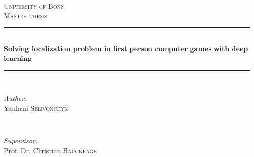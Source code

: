 \begin{titlepage}

\newcommand{\HRule}{\rule{\linewidth}{0.5mm}} %

\center %

\textsc{}\\[0.5cm]
\textsc{\LARGE University of Bonn}\\[3cm] %
\textsc{\Large Master thesis}\\[0.5cm] %


\HRule \\[0.4cm]
{ \huge \bfseries Solving localization problem in first person computer games with deep learning}\\[0.4cm] %
\HRule \\[1.5cm]


\begin{minipage}{0.4\textwidth}
  \begin{flushleft} \large
  \emph{Author:}\\
  Yauheni \textsc{Selivonchyk} %
  \end{flushleft}
\end{minipage}
~
\begin{minipage}{0.5\textwidth}
  \begin{flushright} \large
  \emph{Supervisor:} \\
  Prof. Dr. Christian \textsc{Bauckhage} %

  \end{flushright}
\end{minipage}\\[0.5cm]


\end{titlepage}
